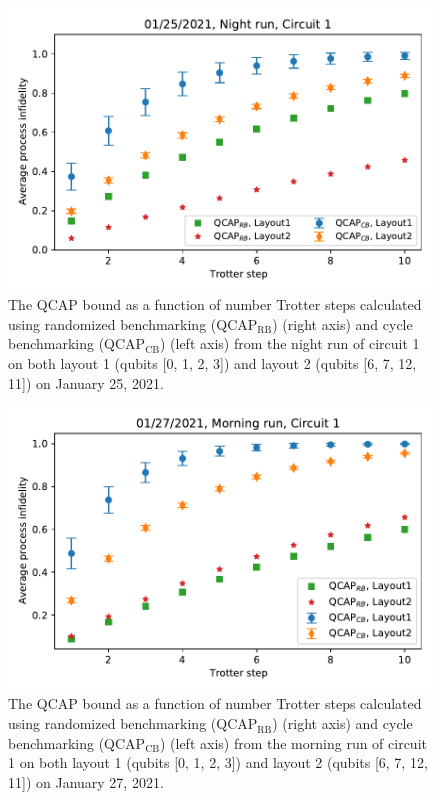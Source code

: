 \begin{figure}[htpb]
    \includegraphics[scale=0.56]{QCAP_CB_RB_Data_01_25_2021_Layout_1_2C1_Night.pdf}
    \caption{The QCAP bound as a function of number Trotter steps calculated using randomized benchmarking (QCAP$_{\text{RB}}$) (right axis) and cycle benchmarking (QCAP$_{\text{CB}}$) (left axis) from the night run of circuit 1 on both layout 1 (qubits [0, 1, 2, 3]) and layout 2 (qubits [6, 7, 12, 11]) on January 25, 2021.}
    \label{fig:QCAP_CB_RB_Data_01_25_2021_Layout_1_2C1_Night}
\end{figure}


\begin{figure}[htpb]
    \includegraphics[scale=0.56]{QCAP_CB_RB_Data_01_27_2021_Layout_1_2C1_Morning.pdf}
    \caption{The QCAP bound as a function of number Trotter steps calculated using randomized benchmarking (QCAP$_{\text{RB}}$) (right axis) and cycle benchmarking (QCAP$_{\text{CB}}$) (left axis) from the morning run of circuit 1 on both layout 1 (qubits [0, 1, 2, 3]) and layout 2 (qubits [6, 7, 12, 11]) on January 27, 2021.}
    \label{fig:QCAP_CB_RB_Data_01_27_2021_Layout_1_2C1_Morning}
\end{figure}
















